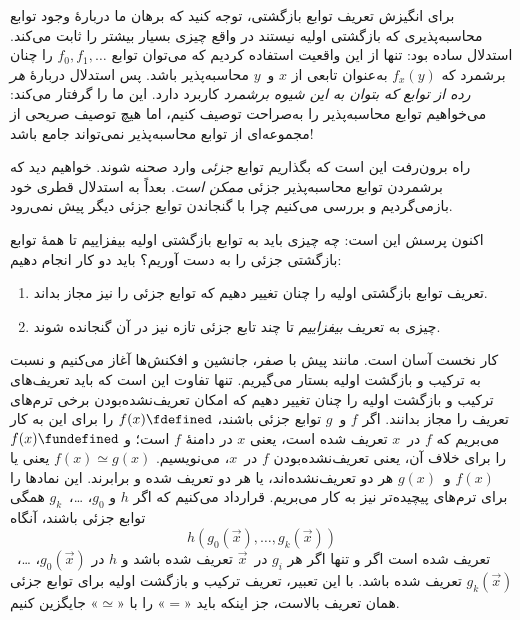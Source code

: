 \documentclass[../../../include/open-logic-section]{subfiles}
\begin{document}

برای انگیزش تعریف توابع بازگشتی، توجه کنید که برهان ما دربارهٔ وجود
توابع محاسبه‌پذیری که بازگشتی اولیه نیستند در واقع چیزی بسیار بیشتر
را ثابت می‌کند. استدلال ساده بود: تنها از این واقعیت استفاده کردیم که
می‌توان توابع $f_0,f_1,\dots$ را چنان برشمرد که $f_x(y)$ به‌عنوان
تابعی از $x$ و~$y$ محاسبه‌پذیر باشد. پس استدلال دربارهٔ
\emph{هر رده از توابع که بتوان به این شیوه برشمرد} کاربرد دارد. این
ما را گرفتار می‌کند: می‌خواهیم توابع محاسبه‌پذیر را به‌صراحت توصیف
کنیم، اما هیچ توصیف صریحی از مجموعه‌ای از توابع محاسبه‌پذیر نمی‌تواند
جامع باشد!

راه برون‌رفت این است که بگذاریم توابع \emph{جزئی} وارد صحنه شوند.
خواهیم دید که برشمردن توابع محاسبه‌پذیر جزئی \emph{ممکن است}.
 بعداً به استدلال
قطری خود بازمی‌گردیم و بررسی می‌کنیم چرا با گنجاندن توابع جزئی دیگر
پیش نمی‌رود.

اکنون پرسش این است: چه چیزی باید به توابع بازگشتی اولیه بیفزاییم تا
همهٔ توابع بازگشتی جزئی را به دست آوریم؟ باید دو کار انجام دهیم:
\begin{enumerate}
\item تعریف توابع بازگشتی اولیه را چنان تغییر دهیم که توابع جزئی را
  نیز مجاز بداند.
\item چیزی به تعریف \emph{بیفزاییم} تا چند تابع جزئی تازه نیز در آن
  گنجانده شوند.
\end{enumerate}

کار نخست آسان است. مانند پیش با صفر، جانشین و افکنش‌ها آغاز می‌کنیم
و نسبت به ترکیب و بازگشت اولیه بستار می‌گیریم. تنها تفاوت این است که
باید تعریف‌های ترکیب و بازگشت اولیه را چنان تغییر دهیم که امکان
تعریف‌نشده‌بودن برخی ترم‌های تعریف را مجاز بدانند. اگر $f$ و~$g$
توابع جزئی باشند، $f(x) \fdefined$ را برای این به کار می‌بریم که $f$
در~$x$ تعریف شده است، یعنی $x$ در دامنهٔ $f$ است؛ و
$f(x) \fundefined$ را برای خلاف آن، یعنی تعریف‌نشده‌بودن $f$ در~$x$،
می‌نویسیم. $f(x)\simeq g(x)$ یعنی یا $f(x)$ و~$g(x)$ هر دو
تعریف‌نشده‌اند، یا هر دو تعریف شده و برابرند. این نمادها را برای
ترم‌های پیچیده‌تر نیز به کار می‌بریم. قرارداد می‌کنیم که اگر $h$ و
$g_0$، \dots،~$g_k$ همگی توابع جزئی باشند، آنگاه
\[
h(g_0(\vec x),\dots,g_k(\vec x))
\]
تعریف شده است اگر و تنها اگر هر $g_i$ در~$\vec x$ تعریف شده باشد و
$h$ در $g_0(\vec x)$، \dots،~$g_k(\vec x)$ تعریف شده باشد. با این
تعبیر، تعریف ترکیب و بازگشت اولیه برای توابع جزئی همان تعریف بالاست،
جز اینکه باید «$=$» را با «$\simeq$» جایگزین کنیم.
\end{document}
